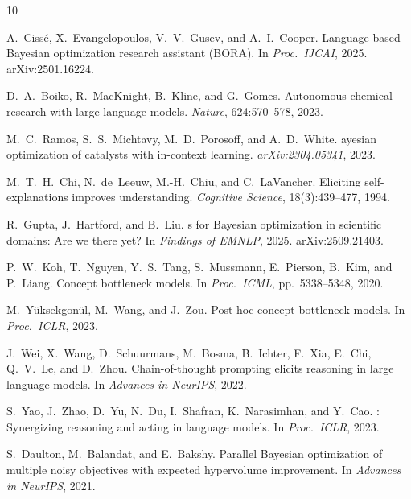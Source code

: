 \documentclass[11pt,letterpaper]{article}
\begin{document}
\begin{thebibliography}{10}

A.~Ciss\'{e}, X.~Evangelopoulos, V.~V.~Gusev, and A.~I.~Cooper.
\newblock Language-based {B}ayesian optimization research assistant ({BORA}).
\newblock In \emph{Proc.\ IJCAI}, 2025. arXiv:2501.16224.

D.~A.~Boiko, R.~MacKnight, B.~Kline, and G.~Gomes.
\newblock Autonomous chemical research with large language models.
\newblock \emph{Nature}, 624:570--578, 2023.

M.~C.~Ramos, S.~S.~Michtavy, M.~D.~Porosoff, and A.~D.~White.
ayesian optimization of catalysts with in-context learning.
\newblock \emph{arXiv:2304.05341}, 2023.

M.~T.~H.~Chi, N.~de~Leeuw, M.-H.~Chiu, and C.~LaVancher.
\newblock Eliciting self-explanations improves understanding.
\newblock \emph{Cognitive Science}, 18(3):439--477, 1994.

R.~Gupta, J.~Hartford, and B.~Liu.
s for {B}ayesian optimization in scientific domains: Are we
  there yet?
\newblock In \emph{Findings of EMNLP}, 2025. arXiv:2509.21403.

P.~W.~Koh, T.~Nguyen, Y.~S.~Tang, S.~Mussmann, E.~Pierson, B.~Kim, and
  P.~Liang.
\newblock Concept bottleneck models.
\newblock In \emph{Proc.\ ICML}, pp.~5338--5348, 2020.

M.~Y\"{u}ksekgon\"{u}l, M.~Wang, and J.~Zou.
\newblock Post-hoc concept bottleneck models.
\newblock In \emph{Proc.\ ICLR}, 2023.

J.~Wei, X.~Wang, D.~Schuurmans, M.~Bosma, B.~Ichter, F.~Xia, E.~Chi,
  Q.~V.~Le, and D.~Zhou.
\newblock Chain-of-thought prompting elicits reasoning in large language models.
\newblock In \emph{Advances in NeurIPS}, 2022.

S.~Yao, J.~Zhao, D.~Yu, N.~Du, I.~Shafran, K.~Narasimhan, and Y.~Cao.
: Synergizing reasoning and acting in language models.
\newblock In \emph{Proc.\ ICLR}, 2023.

S.~Daulton, M.~Balandat, and E.~Bakshy.
\newblock Parallel {B}ayesian optimization of multiple noisy objectives with
  expected hypervolume improvement.
\newblock In \emph{Advances in NeurIPS}, 2021.

\end{thebibliography}
\end{document}
